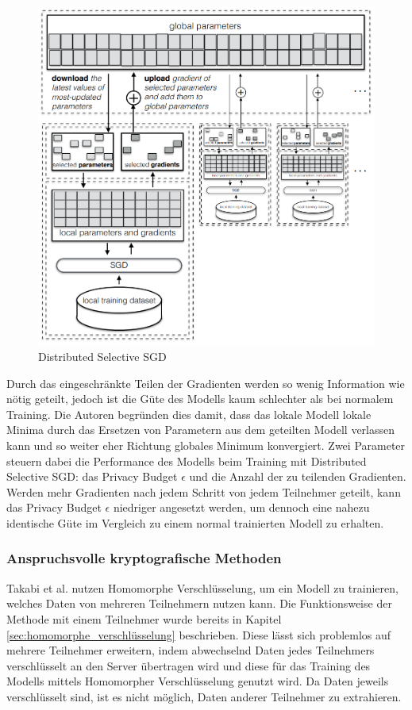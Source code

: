\begin{figure}[!htb]
    \centering
    \includegraphics[width=12cm]{figures/dssgd}
    \caption{Distributed Selective SGD \cite{P-78}}
    \label{fig:dssgd}
\end{figure} 

Durch das eingeschränkte Teilen der Gradienten werden so wenig Information wie nötig geteilt, jedoch ist die Güte des Modells kaum schlechter als bei normalem Training.
Die Autoren begründen dies damit, dass das lokale Modell lokale Minima durch das Ersetzen von Parametern aus dem geteilten Modell verlassen kann und so weiter eher Richtung globales Minimum konvergiert. 
Zwei Parameter steuern dabei die Performance des Modells beim Training mit Distributed Selective SGD: das Privacy Budget $\epsilon$ und die Anzahl der zu teilenden Gradienten.
Werden mehr Gradienten nach jedem Schritt von jedem Teilnehmer geteilt, kann das Privacy Budget $\epsilon$ niedriger angesetzt werden, um dennoch eine nahezu identische Güte im Vergleich zu einem normal trainierten Modell zu erhalten.

\subsubsection*{Anspruchsvolle kryptografische Methoden}

Takabi et al. \cite{P-104} nutzen Homomorphe Verschlüsselung, um ein Modell zu trainieren, welches Daten von mehreren Teilnehmern nutzen kann. 
Die Funktionsweise der Methode mit einem Teilnehmer wurde bereits in Kapitel \ref{sec:homomorphe_verschlüsselung} beschrieben.
Diese lässt sich problemlos auf mehrere Teilnehmer erweitern, indem abwechselnd Daten jedes Teilnehmers verschlüsselt an den Server übertragen wird und diese für das Training des Modells mittels Homomorpher Verschlüsselung genutzt wird.
Da Daten jeweils verschlüsselt sind, ist es nicht möglich, Daten anderer Teilnehmer zu extrahieren.


